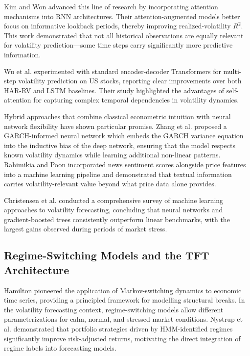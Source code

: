 Kim and Won \cite{kim2022} advanced this line of research by incorporating attention mechanisms into RNN architectures. Their attention-augmented models better focus on informative lookback periods, thereby improving realized-volatility $R^2$. This work demonstrated that not all historical observations are equally relevant for volatility prediction---some time steps carry significantly more predictive information.

Wu et al. \cite{wu2023} experimented with standard encoder-decoder Transformers for multi-step volatility prediction on US stocks, reporting clear improvements over both HAR-RV and LSTM baselines. Their study highlighted the advantages of self-attention for capturing complex temporal dependencies in volatility dynamics.

Hybrid approaches that combine classical econometric intuition with neural network flexibility have shown particular promise. Zhang et al. \cite{zhang2023} proposed a GARCH-informed neural network which embeds the GARCH variance equation into the inductive bias of the deep network, ensuring that the model respects known volatility dynamics while learning additional non-linear patterns. Rahimikia and Poon \cite{rahimikia2023} incorporated news sentiment scores alongside price features into a machine learning pipeline and demonstrated that textual information carries volatility-relevant value beyond what price data alone provides.

Christensen et al. \cite{christensen2023} conducted a comprehensive survey of machine learning approaches to volatility forecasting, concluding that neural networks and gradient-boosted trees consistently outperform linear benchmarks, with the largest gains observed during periods of market stress.

\subsection{Regime-Switching Models and the TFT Architecture}

Hamilton \cite{hamilton1989} pioneered the application of Markov-switching dynamics to economic time series, providing a principled framework for modelling structural breaks. In the volatility forecasting context, regime-switching models allow different parameterizations for calm, normal, and stressed market conditions. Nystrup et al. \cite{nystrup2021} demonstrated that portfolio strategies driven by HMM-identified regimes significantly improve risk-adjusted returns, motivating the direct integration of regime labels into forecasting models.

